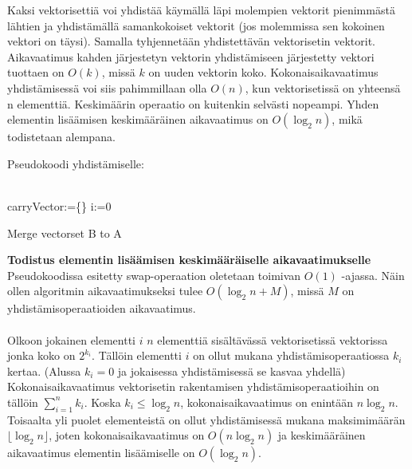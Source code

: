 \documentclass{article}
\begin{document}
    Kaksi vektorisettiä voi yhdistää käymällä läpi molempien vektorit pienimmästä lähtien ja yhdistämällä samankokoiset vektorit 
    (jos molemmissa sen kokoinen vektori on täysi). Samalla tyhjennetään yhdistettävän vektorisetin vektorit. Aikavaatimus kahden 
    järjestetyn vektorin yhdistämiseen järjestetty vektori tuottaen on $O(k)$, missä $k$ on uuden vektorin koko. Kokonaisaikavaatimus
    yhdistämisessä voi siis pahimmillaan olla $O(n)$, kun vektorisetissä on yhteensä n elementtiä. Keskimäärin operaatio on kuitenkin
    selvästi nopeampi. Yhden elementin lisäämisen keskimääräinen aikavaatimus on $O(\log_2 n)$, mikä todistetaan alempana.
    
    Pseudokoodi yhdistämiselle:
    \\ \\
    \begin{algorithm}[H]
        carryVector:=\{\}\;
        i:=0\;
        \caption{Merge vectorset B to A}
    \end{algorithm}
    
    \medskip \medskip
    \textbf{Todistus elementin lisäämisen keskimääräiselle aikavaatimukselle}
    Pseudokoodissa esitetty swap-operaation oletetaan toimivan $O(1)$ -ajassa. Näin ollen algoritmin aikavaatimukseksi tulee
    $O(\log_2 n + M)$, missä $M$ on yhdistämisoperaatioiden aikavaatimus.
    \\ \\
    Olkoon jokainen elementti $i$ $n$ elementtiä sisältävässä vektorisetissä vektorissa jonka koko on $2^{k_i}$. Tällöin
    elementti $i$ on ollut mukana yhdistämisoperaatiossa $k_i$ kertaa. (Alussa $k_i=0$ ja jokaisessa yhdistämisessä 
    se kasvaa yhdellä) Kokonaisaikavaatimus vektorisetin rakentamisen yhdistämisoperaatioihin on tällöin $\sum_{i=1}^n{k_i}$. 
    Koska $k_i\leq \log_2n$, kokonaisaikavaatimus on enintään $n\log_2n$. Toisaalta yli puolet elementeistä on ollut yhdistämisessä
    mukana maksimimäärän $\lfloor \log_2n \rfloor$, joten kokonaisaikavaatimus on $O(n\log_2n)$ ja keskimääräinen aikavaatimus elementin lisäämiselle 
    on $O(\log_2 n)$.
\end{document}
